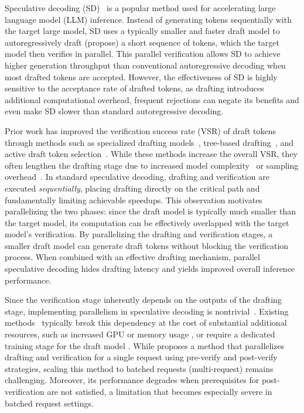 

Speculative decoding (SD)~\citep{leviathan2023, ryu2024closerlook-survey,xia2024sd-survey} is a popular method used for accelerating large language model (LLM) inference. 
Instead of generating tokens sequentially with the target large model, SD uses a typically smaller and faster draft model to autoregressively draft (propose) a short sequence of tokens, which the target model then verifies in parallel.
This parallel verification allows SD to achieve higher generation throughput than conventional autoregressive decoding when most drafted tokens are accepted. 
However, the effectiveness of SD is highly sensitive to the acceptance rate of drafted tokens, as drafting introduces additional computational overhead, frequent rejections can negate its benefits and even make SD slower than standard autoregressive decoding.


Prior work has improved the verification success rate (VSR) of draft tokens through methods such as specialized drafting models~\citep{cai2024medusa,li2024eagle}, tree-based drafting~\citep{wang2025opt}, and active draft token selection~\citep{wu2025tetris}. 
While these methods increase the overall VSR, they often lengthen the drafting stage due to increased model complexity~\citep{cai2024medusa,li2024eagle} or sampling overhead~\citep{wang2025opt,wu2025tetris}.
In standard speculative decoding, drafting and verification are executed \textit{sequentially}, placing drafting directly on the critical path and fundamentally limiting achievable speedups. 
This observation motivates parallelizing the two phases: since the draft model is typically much smaller than the target model, its computation can be effectively overlapped with the target model's verification.
By parallelizing the drafting and verification stages, a smaller draft model can generate draft tokens without blocking the verification process. 
When combined with an effective drafting mechanism, parallel speculative decoding hides drafting latency and yields improved overall inference performance.


Since the verification stage inherently depends on the outputs of the drafting stage, implementing parallelism in speculative decoding is nontrivial~\citep{leviathan2023}. 
Existing methods~\citep{wang2024minions,xiao2025parallelspec,timor2025distributed} typically break this dependency at the cost of substantial additional resources, such as increased GPU or memory usage \citep{wang2024minions, timor2025distributed}, or require a dedicated training stage for the draft model \citep{xiao2025parallelspec}. 
While \citeauthor{liu2025pearl} \citeyearpar{liu2025pearl} proposes a method that parallelizes drafting and verification for a single request using pre-verify and post-verify strategies, scaling this method to batched requests (multi-request) remains challenging. 
Moreover, its performance degrades when prerequisites for post-verification are not satisfied, a limitation that becomes especially severe in batched request settings.


